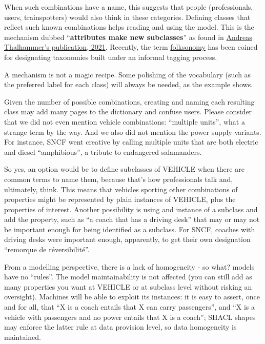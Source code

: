 \documentclass[
  11pt,
]{article}
\begin{document}
When such combinations have a name, this suggests that people
(professionals, users, trainspotters) would also think in these
categories. Defining classes that reflect such known combinations helps
reading and using the model. This is the mechanism dubbed
``\textbf{attributes make new subclasses}'' as found in
\href{https://www.linkedin.com/pulse/meta-way-upper-ontologies-data-meshes-andreas-thalhammer/}{Andreas
Thalhammer's publication, 2021}. Recently, the term
\href{https://en.wikipedia.org/wiki/Folksonomy}{folksonomy} has been
coined for designating taxonomies built under an informal tagging
process.

A mechanism is not a magic recipe. Some polishing of the vocabulary
(such as the preferred label for each class) will always be needed, as
the example shows.

Given the number of possible combinations, creating and naming each
resulting class may add many pages to the dictionary and confuse users.
Please consider that we did not even mention vehicle combinations:
``multiple units'', what a strange term by the way. And we also did not
mention the power supply variants. For instance, SNCF went creative by
calling multiple units that are both electric and diesel ``amphibious'',
a tribute to endangered salamanders.

So yes, an option would be to define subclasses of VEHICLE when there
are common terms to name them, because that's how professionals talk
and, ultimately, think. This means that vehicles sporting other
combinations of properties might be represented by plain instances of
VEHICLE, plus the properties of interest. Another possibility is using
and instance of a subclass and add the property, such as ``a coach that
has a driving desk'' that may or may not be important enough for being
identified as a subclass. For SNCF, coaches with driving desks were
important enough, apparently, to get their own designation ``remorque de
réversibilité''.

From a modelling perspective, there is a lack of homogeneity - so what?
models have no ``rules''. The model maintainability is not affected (you
can still add as many properties you want at VEHICLE or at subclass
level without risking an oversight). Machines will be able to exploit
its instances: it is easy to assert, once and for all, that ``X is a
coach entails that X can carry passengers'', and ``X is a vehicle with
passengers and no power entails that X is a coach''; SHACL shapes may
enforce the latter rule at data provision level, so data homogeneity is
maintained.
\end{document}
